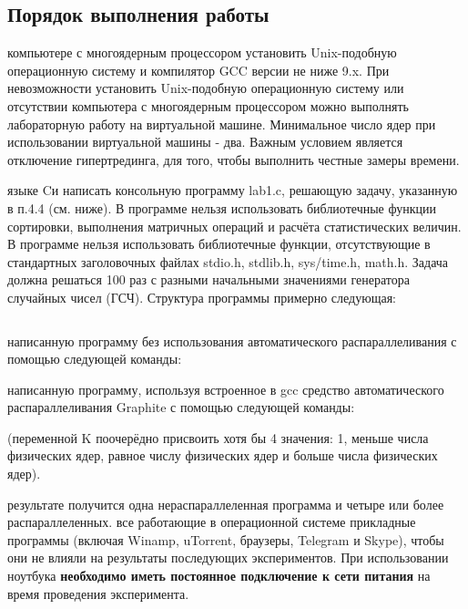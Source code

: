 \subsection{Порядок выполнения работы}
\begin{enumerate}
     компьютере с многоядерным процессором установить Unix-подобную операционную систему и компилятор GCC версии не ниже 9.x. При невозможности установить Unix-подобную операционную систему или отсутствии компьютера с многоядерным процессором можно выполнять лабораторную работу на виртуальной машине. Минимальное число ядер при использовании виртуальной машины - два. Важным условием является отключение гипертрединга, для того, чтобы выполнить честные замеры времени. 
    
     языке Cи написать консольную программу lab1.c, решающую задачу, указанную в п.4.4 (см. ниже). В программе нельзя использовать библиотечные функции сортировки, выполнения матричных операций и расчёта статистических величин. В программе нельзя использовать библиотечные функции, отсутствующие в стандартных заголовочных файлах stdio.h, stdlib.h, sys/time.h, math.h. Задача должна решаться 100 раз с разными начальными значениями генератора случайных чисел (ГСЧ). Структура программы примерно следующая:

    \inputminted[fontsize=\footnotesize]{c++}{listings/lab1Example.cpp}

     написанную программу без использования автоматического распараллеливания с помощью следующей команды: 
    
    
     написанную программу, используя встроенное в gcc средство автоматического распараллеливания Graphite с помощью следующей команды:
    
    
    \noindent(переменной K поочерёдно присвоить хотя бы 4 значения: 1, меньше числа физических ядер, равное числу физических ядер и больше числа физических ядер).
    
     результате получится одна нераспараллеленная программа и четыре или более распараллеленных.
     все работающие в операционной системе прикладные программы (включая Winamp, uTorrent, браузеры, Telegram и Skype), чтобы они не влияли на результаты последующих экспериментов. При использовании ноутбука \textbf{необходимо иметь постоянное подключение к сети питания} на время проведения эксперимента.
    

\end{enumerate}
